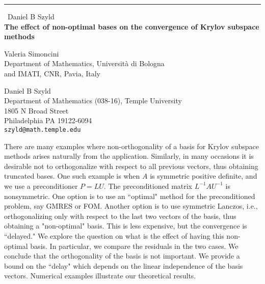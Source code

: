 \documentclass{report}
\begin{document}
\begin{center}
\rule{6in}{1pt} \
{\large Daniel B Szyld \\
{\bf The effect of non-optimal bases on the convergence of Krylov subspace methods}}

Valeria Simoncini \\
Department of Mathematics, Universit\`a di Bologna \\
and IMATI, CNR, Pavia, Italy

Daniel B Szyld \\
Department of Mathematics (038-16), Temple University \\
1805 N Broad Street \\ Philadelphia PA 19122-6094 \\
{\tt szyld@math.temple.edu}

\end{center}

There are many examples where non-orthogonality of a basis
for Krylov subspace methods arises naturally from the
application. Similarly, in many occasions it is desirable
not to orthogonalize with respect to all previous vectors,
thus obtaining truncated bases.
One such example is when $A$ is symmetric positive definite,
and we use a preconditioner $P=LU$. The preconditioned matrix
$L^{-1} A U^{-1}$ is nonsymmetric. One option is to use
an ``optimal" method for the preconditioned problem, say
GMRES or FOM. Another option is to use symmetric Lanczos,
i.e., orthogonalizing only with respect to the last two vectors
of the basis, thus obtaining a "non-optimal" basis.
This is less expensive, but the convergence is ``delayed."
We explore the question on what is the effect of having this
non-optimal basis. In particular, we compare the
residuals in the two cases. We conclude that the orthogonality
of the basis is not important.
We provide a bound on the ``delay" which depends on the
linear independence of the basis vectors.
Numerical examples illustrate our theoretical results.
\end{document}
